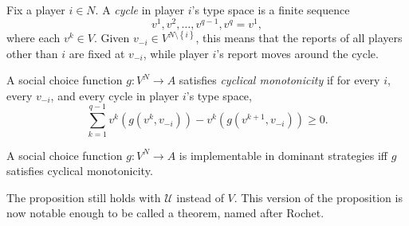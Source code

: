 \begin{definition}
	Fix a player $i \in N$. A \emph{cycle} in player $i$'s type space is a finite sequence \[
		v^1,v^2,\ldots,v^{q-1},v^q = v^1
	,\] where each $v^k \in V$. Given $v_{-i} \in V^{N \setminus \left\{ i \right\}}$, this means that the reports of all players other than $i$ are fixed at $v_{-i}$, while player $i$'s report moves around the cycle.

	A social choice function $g: V^N \to A$ satisfies \emph{cyclical monotonicity} if for every $i$, every $v_{-i}$, and every cycle in player $i$'s type space, \[
		\sum\limits_{k=1}^{q-1} v^k \left( g\left( v^k, v_{-i} \right) \right) - v^k \left( g\left( v^{k+1},v_{-i} \right) \right) \ge 0
	.\] 
\end{definition}

\begin{proposition} \label{4-8-0}
	A social choice function $g: V^{N} \to A$ is implementable in dominant strategies iff $g$ satisfies cyclical monotonicity.
\end{proposition}
\begin{remark}
	The proposition still holds with $\mathscr{U}$ instead of $V$. This version of the proposition is now notable enough to be called a theorem, named after Rochet.
\end{remark}

